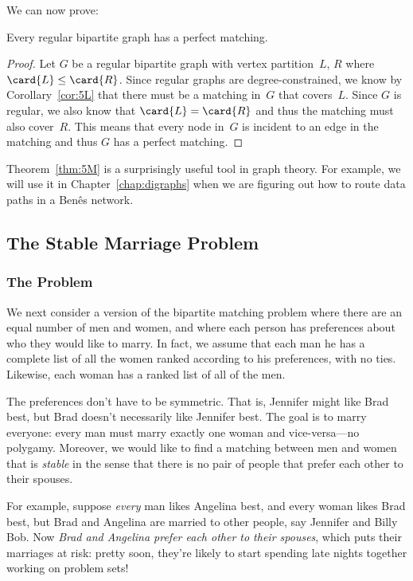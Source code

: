 We can now prove:

\begin{theorem}\label{thm:5M}
Every regular bipartite graph has a perfect matching.
\end{theorem}

\begin{proof}
Let $G$ be a regular bipartite graph with vertex partition~$L$, $R$
where $\card{L} \leq \card{R}$.  Since regular graphs are
degree-constrained, we know by Corollary~\ref{cor:5L} that there must
be a matching in~$G$ that covers~$L$.  Since $G$ is regular, we also
know that $\card{L} = \card{R}$ and thus the matching must also
cover~$R$.  This means that every node in~$G$ is incident to an edge
in the matching and thus $G$ has a perfect matching.
\end{proof}

Theorem~\ref{thm:5M} is a surprisingly useful tool in graph theory.
For example, we will use it in Chapter~\ref{chap:digraphs} when we are
figuring out how to route data paths in a Ben\^es network.

\subsection{The Stable Marriage Problem}
\label{stablemarriagesec}

\subsubsection{The Problem}

We next consider a version of the bipartite matching problem where
there are an equal number of men and women, and where each person has
preferences about who they would like to marry.  In fact, we assume
that each man he has a complete list of all the women ranked according
to his preferences, with no ties.  Likewise, each woman has a ranked
list of all of the men.

The preferences don't have to be symmetric.  That is, Jennifer might
like Brad best, but Brad doesn't necessarily like Jennifer best.  The
goal is to marry everyone: every man must marry exactly one woman and
vice-versa---no polygamy.  Moreover, we would like to find a matching
between men and women that is \emph{stable} in the sense that there is
no pair of people that prefer each other to their spouses.

For example, suppose \emph{every} man likes Angelina best, and every
woman likes Brad best, but Brad and Angelina are married to other
people, say Jennifer and Billy Bob.  Now \emph{Brad and Angelina
  prefer each other to their spouses}, which puts their marriages at
risk: pretty soon, they're likely to start spending late nights
together working on problem sets!

